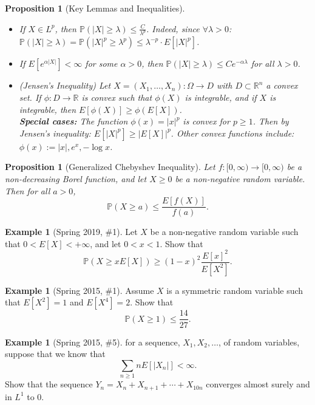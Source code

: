 \documentclass[12pt,reqno]{article}
\renewcommand{\emph}[1]{\textit{#1}}
\theoremstyle{plain}
\newtheorem{prop}[theorem]{Proposition}
\theoremstyle{definition}
\newtheorem{example}[theorem]{Example}
\newcommand{\PP}[1]{\ensuremath{\mathbb{P}\left(#1\right)}}
\begin{document}
\begin{prop}[Key Lemmas and Inequalities]
\begin{itemize}
\item[(D)] If $X \in L^p$, then 
     $\mathbb{P}(|X| \geq \lambda) \leq \frac{C}{\lambda^p}$. Indeed, 
     since $\forall \lambda > 0$: 
     $\mathbb{P}(|X| \geq \lambda) = \mathbb{P}(|X|^p \geq \lambda^p) \leq 
     \lambda^{-p} \cdot E[|X|^p]$. 
\item[(E)] If $E[e^{\alpha |X|}] < \infty$ for some $\alpha > 0$, then 
     $\mathbb{P}(|X| \geq \lambda) \leq C e^{-\alpha\lambda}$ for all 
     $\lambda > 0$. 
\item[(F)] (\emph{Jensen's Inequality}) 
     Let $X = (X_1,\ldots,X_n): \Omega \rightarrow D$ with 
     $D \subset \mathbb{R}^n$ a convex set. If 
     $\phi: D \rightarrow \mathbb{R}$ is convex such that 
     $\phi(X)$ is integrable, and if $X$ is integrable, then 
     $E[\phi(X)] \geq \phi(E[X])$. \\ 
     \textbf{Special cases:} The function $\phi(x) = |x|^p$ is convex for 
     $p \geq 1$. Then by Jensen's inequality: 
     $E[|X|^p] \geq |E[X]|^p$. Other convex functions include: 
     $\phi(x) := |x|, e^x, -\log x$. 
\end{itemize} 
\end{prop} 

\begin{prop}[Generalized Chebyshev Inequality]
Let $f: [0, \infty) \rightarrow [0, \infty)$ be a non-decreasing Borel function, and 
let $X \geq 0$ be a non-negative random variable. Then for all $a > 0$, 
\[
\PP{X \geq a} \leq \frac{E[f(X)]}{f(a)}. 
\]
\end{prop} 

\begin{example}[Spring 2019, \#1]
Let $X$ be a non-negative random variable such that $0 < E[X] < +\infty$, and 
let $0 < x < 1$. Show that 
\[
\PP{X \geq x E[X]} \geq (1-x)^2 \frac{E[x]^2}{E[X^2]}. 
\]
\end{example} 

\begin{example}[Spring 2015, \#1]
Assume $X$ is a symmetric random variable such that $E[X^2] = 1$ and 
$E[X^4] = 2$. Show that 
\[
\PP{X \geq 1} \leq \frac{14}{27}.
\]
\end{example} 

\begin{example}[Spring 2015, \#5]
for a sequence, $X_1,X_2,\ldots$, of random variables, suppose that we 
know that 
\[
\sum_{n \geq 1} n E[|X_n|] < \infty. 
\]
Show that the sequence $Y_n = X_n + X_{n+1}+\cdots+X_{10n}$ converges 
almost surely and in $L^1$ to $0$. 
\end{example} 
\end{document}
